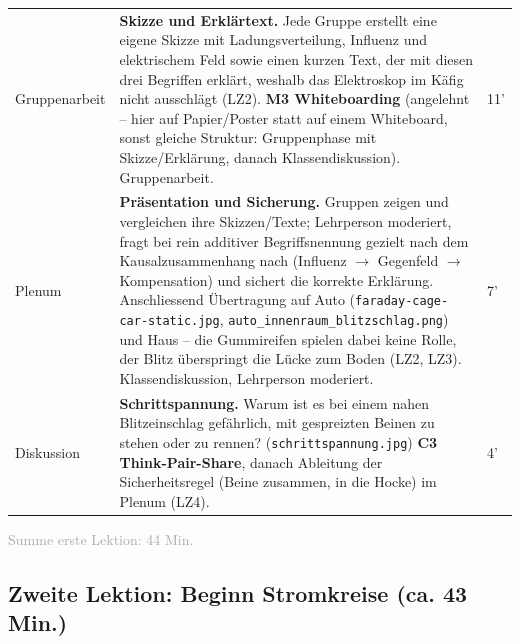 \documentclass[11pt,a4paper]{article}
\newcommand{\Methode}[1]{{\small\color{groupteal}\textbf{#1}}}
\begin{document}
\begin{xltabular}{\textwidth}{@{}p{2.6cm}X p{1.2cm}@{}}
Gruppenarbeit &
\textbf{Skizze und Erklärtext.} Jede Gruppe erstellt eine eigene Skizze
mit Ladungsverteilung, Influenz und elektrischem Feld sowie einen kurzen
Text, der mit diesen drei Begriffen erklärt, weshalb das Elektroskop im
Käfig nicht ausschlägt (LZ2). \Methode{M3 Whiteboarding} (angelehnt --
hier auf Papier/Poster statt auf einem Whiteboard, sonst gleiche
Struktur: Gruppenphase mit Skizze/Erklärung, danach Klassendiskussion).
Gruppenarbeit. &
11' \\[0.4em]

Plenum &
\textbf{Präsentation und Sicherung.} Gruppen zeigen und vergleichen ihre
Skizzen/Texte; Lehrperson moderiert, fragt bei rein additiver
Begriffsnennung gezielt nach dem Kausalzusammenhang nach (Influenz
$\to$ Gegenfeld $\to$ Kompensation) und sichert die korrekte Erklärung.
Anschliessend Übertragung auf Auto (\texttt{faraday-cage-car-static.jpg},
\texttt{auto\_innenraum\_blitzschlag.png}) und Haus -- die Gummireifen
spielen dabei keine Rolle, der Blitz überspringt die Lücke zum Boden
(LZ2, LZ3). Klassendiskussion, Lehrperson moderiert. &
7' \\[0.4em]

Diskussion &
\textbf{Schrittspannung.} Warum ist es bei einem nahen Blitzeinschlag
gefährlich, mit gespreizten Beinen zu stehen oder zu rennen?
(\texttt{schrittspannung.jpg}) \Methode{C3 Think-Pair-Share}, danach
Ableitung der Sicherheitsregel (Beine zusammen, in die Hocke) im Plenum
(LZ4). &
4' \\

\bottomrule
\end{xltabular}

\textcolor{darkgray}{\small Summe erste Lektion: 44 Min.}

\vspace{0.6em}
\subsection*{Zweite Lektion: Beginn Stromkreise (ca. 43 Min.)}
\end{document}
